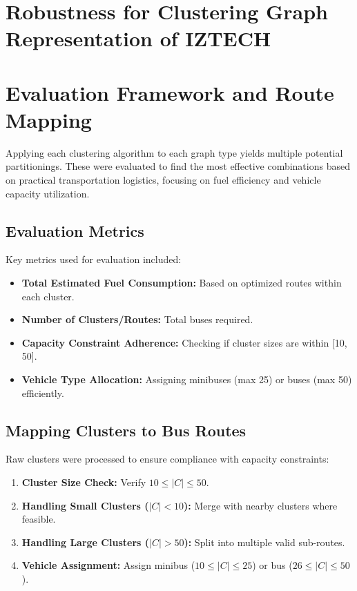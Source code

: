 \section{Robustness for Clustering Graph Representation of IZTECH}
\label{sec:robustness}


\section{Evaluation Framework and Route Mapping}
\label{sec:evaluation}

Applying each clustering algorithm to each graph type yields multiple potential partitionings. These were evaluated to find the most effective combinations based on practical transportation logistics, focusing on fuel efficiency and vehicle capacity utilization.

\subsection{Evaluation Metrics}
Key metrics used for evaluation included:
\begin{itemize}
    \item \textbf{Total Estimated Fuel Consumption:} Based on optimized routes within each cluster.
    \item \textbf{Number of Clusters/Routes:} Total buses required.
    \item \textbf{Capacity Constraint Adherence:} Checking if cluster sizes are within [10, 50].
    \item \textbf{Vehicle Type Allocation:} Assigning minibuses (max 25) or buses (max 50) efficiently.
\end{itemize}

\subsection{Mapping Clusters to Bus Routes}
Raw clusters were processed to ensure compliance with capacity constraints:
\begin{enumerate}
    \item \textbf{Cluster Size Check:} Verify $10 \leq |C| \leq 50$.
    \item \textbf{Handling Small Clusters ($|C| < 10$):} Merge with nearby clusters where feasible.
    \item \textbf{Handling Large Clusters ($|C| > 50$):} Split into multiple valid sub-routes.
    \item \textbf{Vehicle Assignment:} Assign minibus ($10 \leq |C| \leq 25$) or bus ($26 \leq |C| \leq 50$).
\end{enumerate}

